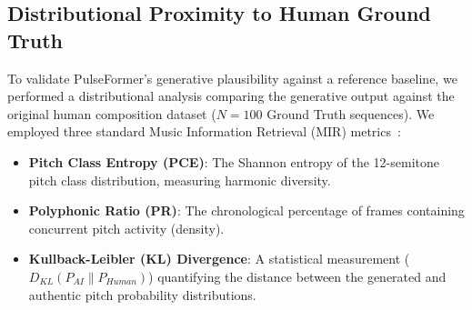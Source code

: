 \documentclass[conference]{IEEEtran}
\begin{document}
\subsection{Distributional Proximity to Human Ground Truth}
To validate PulseFormer's generative plausibility against a reference baseline, we performed a distributional analysis comparing the generative output against the original human composition dataset ($N=100$ Ground Truth sequences). We employed three standard Music Information Retrieval (MIR) metrics~\cite{raffel2014mir_eval, kilgour2019frechet}:
\begin{itemize}
    \item \textbf{Pitch Class Entropy (PCE)}: The Shannon entropy of the 12-semitone pitch class distribution, measuring harmonic diversity.
    \item \textbf{Polyphonic Ratio (PR)}: The chronological percentage of frames containing concurrent pitch activity (density).
    \item \textbf{Kullback-Leibler (KL) Divergence}: A statistical measurement ($D_{KL}(P_{AI} \parallel P_{Human})$) quantifying the distance between the generated and authentic pitch probability distributions.
\end{itemize}
\end{document}
